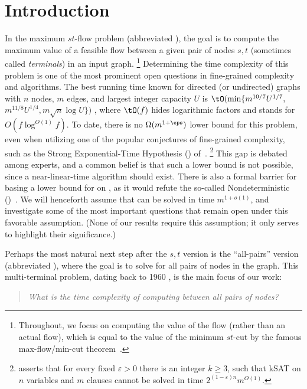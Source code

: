 
%
%
%

%
\section{Introduction}

In the maximum $st$-flow problem (abbreviated \MF),
the goal is to compute the maximum value of a feasible flow
%
between a given pair of nodes $s,t$ (sometimes called \emph{terminals})
in an input graph.%
\footnote{Throughout, we focus on computing the value of the flow
  (rather than an actual flow),
  which is equal to the value of the minimum $st$-cut
  by the famous max-flow/min-cut theorem~\cite{FF56}.
}
%
Determining the time complexity of this problem is one of the most prominent open questions in fine-grained complexity and algorithms.
The best running time known for directed (or undirected)
graphs with $n$ nodes, $m$ edges, and largest integer capacity $U$ is
$\tO(\min\{m^{10/7}U^{1/7},$ $m^{11/8} U^{1/4}, m \sqrt{n}\log U\})$ \cite{Madry16,LS19,lee2014path},
where %
%
%
$\tO(f)$ hides logarithmic factors
and stands for $O(f \log^{O(1)} f)$.
To date, there is no $\Omega(m^{1+\eps})$  lower bound for this problem,
even when utilizing one of the popular conjectures of fine-grained complexity,
such as the Strong Exponential-Time Hypothesis (\SETH) of~\cite{ImpaSETH}.%
\footnote{\SETH asserts that for every fixed $\varepsilon>0$
  there is an integer $k\geq 3$,
  such that kSAT on $n$ variables and $m$ clauses
  cannot be solved in time $2^{(1-\varepsilon)n} m^{O(1)}$.
}
This gap is
%
debated among experts,
and a common belief is that such a lower bound is not possible,
since a near-linear-time algorithm
%
%
should exist.  %
There is also a formal barrier for basing a lower bound for \MF on \SETH,
  as it would refute the so-called
%
%
Nondeterministic
\SETH (\NSETH)~\cite{carmosino2016nondeterministic}.
We will henceforth assume that \MF can be solved in time $m^{1+o(1)}$,
and investigate some of the most important questions that remain open under this favorable assumption.
(None of our results
%
require  %
this assumption; it only serves
%
%
%
%
to highlight their
%
significance.)

Perhaps the most natural
%
next step   %
after the $s,t$ version is the ``all-pairs'' version (abbreviated \APMF),
where the goal is to solve \MF for all pairs of nodes in the graph.
This multi-terminal problem, dating back to 1960 \cite{Mayeda60,Chien60},
is the main focus of our work:
\begin{quotation}
\emph{What is the time complexity of computing \MF between all pairs of nodes?}
\end{quotation}

